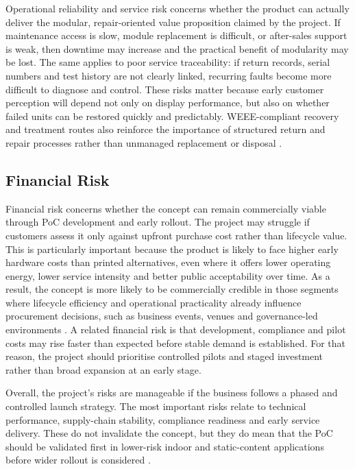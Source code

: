 \documentclass[11pt,a4paper]{article}
\begin{document}
Operational reliability and service risk concerns whether the product can actually deliver the modular, repair-oriented value proposition claimed by the project. If maintenance access is slow, module replacement is difficult, or after-sales support is weak, then downtime may increase and the practical benefit of modularity may be lost. The same applies to poor service traceability: if return records, serial numbers and test history are not clearly linked, recurring faults become more difficult to diagnose and control. These risks matter because early customer perception will depend not only on display performance, but also on whether failed units can be restored quickly and predictably. WEEE-compliant recovery and treatment routes also reinforce the importance of structured return and repair processes rather than unmanaged replacement or disposal \cite{ref22}.

\subsection{Financial Risk}

Financial risk concerns whether the concept can remain commercially viable through PoC development and early rollout. The project may struggle if customers assess it only against upfront purchase cost rather than lifecycle value. This is particularly important because the product is likely to face higher early hardware costs than printed alternatives, even where it offers lower operating energy, lower service intensity and better public acceptability over time. As a result, the concept is more likely to be commercially credible in those segments where lifecycle efficiency and operational practicality already influence procurement decisions, such as business events, venues and governance-led environments \cite{ref6,ref4}. A related financial risk is that development, compliance and pilot costs may rise faster than expected before stable demand is established. For that reason, the project should prioritise controlled pilots and staged investment rather than broad expansion at an early stage.

Overall, the project's risks are manageable if the business follows a phased and controlled launch strategy. The most important risks relate to technical performance, supply-chain stability, compliance readiness and early service delivery. These do not invalidate the concept, but they do mean that the PoC should be validated first in lower-risk indoor and static-content applications before wider rollout is considered \cite{ref2}\cite{ref4}\cite{ref6}.
\end{document}
